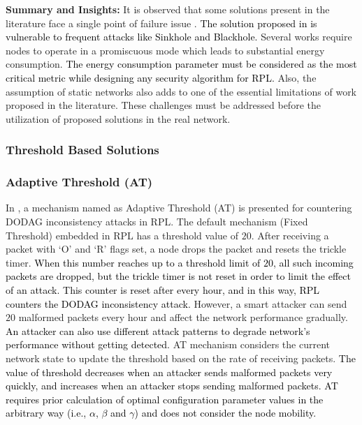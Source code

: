 \documentclass[10pt,journal,sort & compress]{IEEEtran}
\begin{document}
\textbf{Summary and Insights:} It is observed that some solutions present in the literature face a single point of failure issue \cite{seeber2013towards, Djedjig2017}. \textcolor{black}{The solution proposed in \cite{iuchi2015secure} is vulnerable to frequent attacks like Sinkhole and Blackhole.} Several works \cite{Airehrour2017AJTDE, Airehrour2018, nygaard2017intrusion} require nodes to operate in a promiscuous mode which leads to substantial energy consumption. \textcolor{black}{The energy consumption parameter must be considered as the most critical metric while designing any security algorithm for RPL.} Also, the assumption of static networks also adds to one of the essential limitations of work proposed in the literature. These challenges must be addressed before the utilization of proposed solutions in the real network.          


\subsubsection{Threshold Based Solutions}

\subsubsection*{Adaptive Threshold (AT)}
In \cite{Sehgal2014}, a mechanism named as Adaptive Threshold (AT) is presented for countering DODAG inconsistency attacks in RPL. The default mechanism (Fixed Threshold) embedded in RPL has a threshold value of $ 20 $. After receiving a packet with `O' and `R' flags set, a node drops the packet and resets the trickle timer. \textcolor{black}{When this number reaches up to a threshold limit of $ 20 $, all such incoming packets are dropped, but the trickle timer is not reset in order to limit the effect of an attack.} \textcolor{black}{This counter is reset after every hour, and in this way, RPL counters the DODAG inconsistency attack.} However, a smart attacker can send $ 20 $ malformed packets every hour and affect the network performance gradually. \textcolor{black}{An attacker can also use different attack patterns to degrade network's performance without getting detected.} AT mechanism considers the current network state to update the threshold based on the rate of receiving packets. \textcolor{black}{The value of threshold decreases when an attacker sends malformed packets very quickly, and increases when an attacker stops sending malformed packets. AT requires prior calculation of optimal configuration parameter values in the arbitrary way (i.e., $ \alpha $, $ \beta $ and $ \gamma$) and does not consider the node mobility.}
\end{document}
